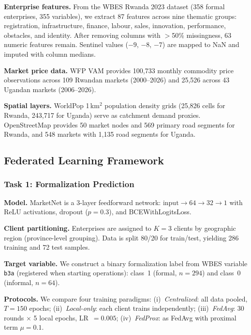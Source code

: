 \documentclass{article}
\begin{document}
\textbf{Enterprise features.}
From the WBES Rwanda 2023 dataset \cite{worldbank2023wbes} (358 formal enterprises, 355 variables), we extract 87 features across nine thematic groups: registration, infrastructure, finance, labour, sales, innovation, performance, obstacles, and identity.
After removing columns with $>$50\% missingness, 63 numeric features remain.
Sentinel values ($-9$, $-8$, $-7$) are mapped to NaN and imputed with column medians.

\textbf{Market price data.}
WFP VAM \cite{wfp2024vam} provides 100,733 monthly commodity price observations across 109 Rwandan markets (2000--2026) and 25,526 across 43 Ugandan markets (2006--2026).

\textbf{Spatial layers.}
WorldPop \cite{tatem2017worldpop} 1\,km$^2$ population density grids (25,826 cells for Rwanda, 243,717 for Uganda) serve as catchment demand proxies.
OpenStreetMap \cite{haklay2008openstreetmap} provides 50 market nodes and 569 primary road segments for Rwanda, and 548 markets with 1,135 road segments for Uganda.

\subsection{Federated Learning Framework}

\subsubsection{Task 1: Formalization Prediction}

\textbf{Model.}
MarketNet is a 3-layer feedforward network: $\text{input} \to 64 \to 32 \to 1$ with ReLU activations, dropout ($p{=}0.3$), and BCEWithLogitsLoss.

\textbf{Client partitioning.}
Enterprises are assigned to $K{=}3$ clients by geographic region (province-level grouping).
Data is split 80/20 for train/test, yielding 286 training and 72 test samples.

\textbf{Target variable.}
We construct a binary formalization label from WBES variable \texttt{b3a} (registered when starting operations): class~1 (formal, $n{=}294$) and class~0 (informal, $n{=}64$).

\textbf{Protocols.}
We compare four training paradigms:
(i)~\emph{Centralized}: all data pooled, $T{=}150$ epochs;
(ii)~\emph{Local-only}: each client trains independently;
(iii)~\emph{FedAvg}: 30 rounds $\times$ 5 local epochs, LR~$= 0.005$;
(iv)~\emph{FedProx}: as FedAvg with proximal term $\mu{=}0.1$.
\end{document}
